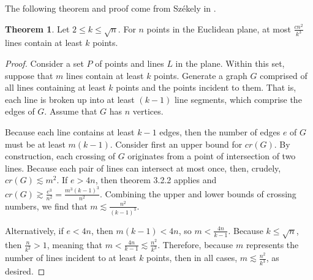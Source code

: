\documentclass{scrippsthesisclass}
\theoremstyle{definition}
\newtheorem{theorem}{Theorem}[section]
\begin{document}
The following theorem and proof come from Sz\'{e}kely in \cite{SzekelyPaper}.
\begin{theorem}
 Let $2 \leq k \leq \sqrt{n}$. For $n$ points in the Euclidean plane, at most $\frac{cn^2}{k^3}$ lines contain at least $k$ points.
\end{theorem}
\begin{proof}
    Consider a set $P$ of points and lines $L$ in the plane.
    Within this set, suppose that $m$ lines contain at least $k$ points.
    Generate a graph $G$ comprised of all lines containing at least $k$ points and the points incident to them. 
    That is, each line is broken up into at least $(k-1)$ line segments, which comprise the edges of $G$.
    Assume that $G$ has $n$ vertices. 

    Because each line contains at least $k-1$ edges, then the number of edges $e$ of $G$ must be at least $m(k-1)$. 
    Consider first an upper bound for $cr(G)$.
    By construction, each crossing of $G$ originates from a point of intersection of two lines. 
    Because each pair of lines can intersect at most once, then, crudely, $cr(G) \lesssim m^2$. 
    If $e > 4n$, then theorem 3.2.2 applies and $cr(G) \gtrsim \frac{e^3}{n^2} = \frac{m^3(k-1)^3}{n^2}$.
    Combining the upper and lower bounds of crossing numbers, we find that 
    $m \lesssim \frac{n^2}{(k-1)^3}$.

    Alternatively, if $e < 4n$, then $m(k-1) < 4n$, so $m < \frac{4n}{k-1}$. Because $k \leq \sqrt{n}$, then  $\frac{n}{k^2} > 1$, meaning that $m < \frac{4n}{k-1} \lesssim \frac{n^2}{k^3}$.
    Therefore, because $m$ represents the number of lines incident to at least $k$ points, then in all cases, $m \lesssim \frac{n^2}{k^3}$, as desired. 
\end{proof}
\end{document}

